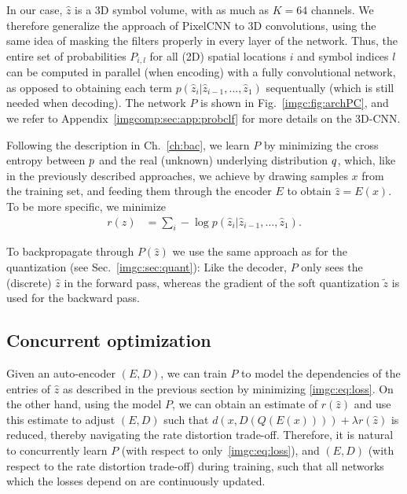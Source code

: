In our case, $\hat z$  is a 3D symbol volume, with as much as $K=64$ channels.
We therefore generalize the approach of PixelCNN to 3D convolutions, using the
same idea of masking the filters properly in every layer of the network.
Thus, the entire set of
probabilities $P_{i,l}$ for all (2D) spatial locations $i$ and symbol indices
$l$ can be computed in parallel (when encoding) with a fully convolutional
network, as opposed to obtaining each term
$p(\hat{z}_i|\hat{z}_{i-1},\dots,\hat{z}_1)$ sequentually (which is still
needed when decoding). 
The network $P$ is shown in Fig.~\ref{imgc:fig:archPC}, and we refer to
Appendix~\ref{imgcomp:sec:app:probclf} for more details on the 3D-CNN.

Following the description in Ch.~\ref{ch:bac}, we learn $P$ by minimizing the cross entropy between $p$ and the real (unknown) underlying distribution $q$, which, like in the previously described approaches, we achieve by drawing samples $x$ from the training set, and feeding them through the encoder $E$ to obtain $\hat z=E(x)$. To be more specific, we minimize
\begin{align}
    r(\hat z) 
        &= \sum_i - \log p(\hat z_i | \hat z_{i-1}, \dots, \hat z_1) .
            \label{imgc:eq:loss}
\end{align}

To backpropagate through $P(\hat z)$ we use the same approach as for the
quantization (see Sec.~\ref{imgc:sec:quant}): Like the decoder, $P$ only sees
the (discrete) $\hat z$ in the forward pass, whereas the gradient of the soft
quantization $\tilde z$ is used for the backward pass.

\subsection{Concurrent optimization}
Given an auto-encoder $(E,D)$, we can train $P$ to model the dependencies of the entries of $\hat z$ as described in the previous section by minimizing \eqref{imgc:eq:loss}. 
On the other hand, using the model $P$, we can obtain an  estimate of $r(\hat z)$ and use this estimate to adjust $(E,D)$ such that $d(x,D(Q(E(x))))+\lambda r(\hat z)$ is reduced, thereby navigating the rate distortion trade-off. 
Therefore, it is natural to concurrently learn $P$ (with respect to only~\ref{imgc:eq:loss}), and $(E,D)$  (with respect to the rate distortion trade-off) during training, such that all networks which the losses depend on are continuously updated.

